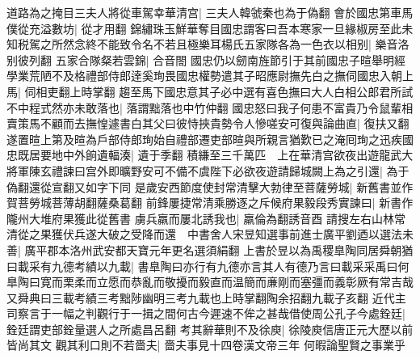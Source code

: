 道路為之掩目三夫人將從車駕幸華清宫|{
	三夫人韓虢秦也為于偽翻}
會於國忠第車馬僕從充溢數坊|{
	從才用翻}
錦繡珠玉鮮華奪目國忠謂客曰吾本寒家一旦緣椒房至此未知税駕之所然念終不能致令名不若且極樂耳楊氏五家隊各為一色衣以相别|{
	樂音洛别彼列翻}
五家合隊粲若雲錦|{
	合音閤}
國忠仍以劒南旌節引于其前國忠子暄舉明經學業荒陋不及格禮部侍郎逹奚珣畏國忠權勢遣其子昭應尉撫先白之撫伺國忠入朝上馬|{
	伺相吏翻上時掌翻}
趨至馬下國忠意其子必中選有喜色撫曰大人白相公郎君所試不中程式然亦未敢落也|{
	落謂黜落也中竹仲翻}
國忠怒曰我子何患不富貴乃令鼠輩相賣策馬不顧而去撫惶遽書白其父曰彼恃挾貴勢令人慘嗟安可復與論曲直|{
	復扶又翻}
遂置暄上第及暄為戶部侍郎珣始自禮部遷吏部暄與所親言猶歎已之淹囘珣之迅疾國忠既居要地中外餉遺輻湊|{
	遺于季翻}
積縑至三千萬匹　上在華清宫欲夜出遊龍武大將軍陳玄禮諫曰宫外即曠野安可不備不虞陛下必欲夜遊請歸城闕上為之引還|{
	為于偽翻還從宣翻又如字下同}
是歲安西節度使封常清擊大勃律至菩薩勞城|{
	新舊書並作賀菩勞城菩薄胡翻薩桑葛翻}
前鋒屢捷常清乘勝逐之斥候府果毅段秀實諫曰|{
	新書作隴州大堆府果獲此從舊書}
虜兵羸而屢北誘我也|{
	羸倫為翻誘音酉}
請搜左右山林常清從之果獲伏兵遂大破之受降而還　中書舍人宋昱知選事前進士廣平劉迺以選法未善|{
	廣平郡本洛州武安都天寶元年更名選須絹翻}
上書於昱以為禹稷臯陶同居舜朝猶曰載采有九德考績以九載|{
	書臯陶曰亦行有九德亦言其人有德乃言曰載采采禹曰何臯陶曰寛而栗柔而立愿而恭亂而敬擾而毅直而温簡而亷剛而塞彊而義彰厥有常吉哉又舜典曰三載考績三考黜陟幽明三考九載也上時掌翻陶余招翻九載子亥翻}
近代主司察言于一幅之判觀行于一揖之間何古今遲速不侔之甚哉借使周公孔子今處銓廷|{
	銓廷謂吏部銓量選人之所處昌呂翻}
考其辭華則不及徐庾|{
	徐陵庾信唐正元大歷以前皆尚其文}
觀其利口則不若嗇夫|{
	嗇夫事見十四卷漢文帝三年}
何暇論聖賢之事業乎

